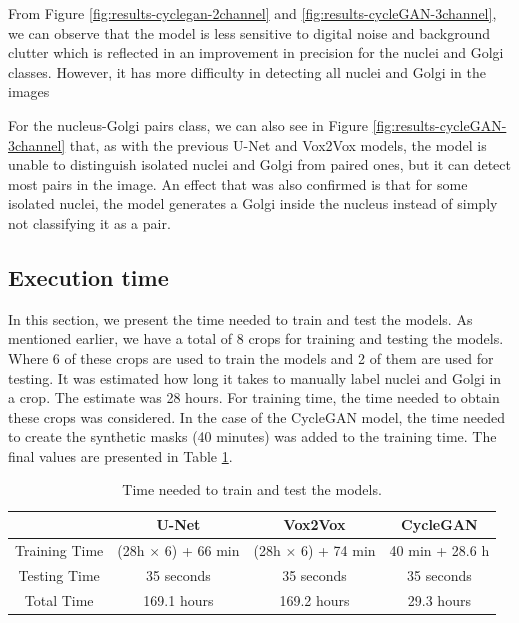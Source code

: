 From Figure \ref{fig:results-cyclegan-2channel} and \ref{fig:results-cycleGAN-3channel}, we can observe that the model is less sensitive to digital noise and background clutter which is reflected in an improvement in precision for the nuclei and Golgi classes. However, it has more difficulty in detecting all nuclei and Golgi in the images 

For the nucleus-Golgi pairs class, we can also see in Figure \ref{fig:results-cycleGAN-3channel} that, as with the previous U-Net and Vox2Vox models, the model is unable to distinguish isolated nuclei and Golgi from paired ones, but it can detect most pairs in the image. An effect that was also confirmed is that for some isolated nuclei, the model generates a Golgi inside the nucleus instead of simply not classifying it as a pair.

\subsection{Execution time}
\label{subsection:execution-time}

In this section, we present the time needed to train and test the models. As mentioned earlier, we have a total of 8 crops for training and testing the models. Where 6 of these crops are used to train the models and 2 of them are used for testing. It was estimated how long it takes to manually label nuclei and Golgi in a crop. The estimate was 28 hours. For training time, the time needed to obtain these crops was considered. In the case of the CycleGAN model, the time needed to create the synthetic masks (40 minutes) was added to the training time. The final values are presented in Table \ref{tab:time}.

\begin{table}[!htb]
\centering
\caption{Time needed to train and test the models.}
\label{tab:time}
\renewcommand\arraystretch{1.4}
\begin{tabular}{c|c|c|c|}
\cline{2-4}
                                    & U-Net                  & Vox2Vox                & CycleGAN               \\ \hline
\multicolumn{1}{|c|}{Training Time} & (28h $\times$ 6) + 66 min     & (28h $\times$ 6) + 74 min     & 40 min + 28.6 h        \\ \hline
\multicolumn{1}{|c|}{Testing Time}  & 35 seconds & 35 seconds & 35 seconds \\ \hline
\multicolumn{1}{|c|}{Total Time}    & 169.1 hours            & 169.2 hours           & 29.3 hours             \\ \hline
\end{tabular}
\end{table}


